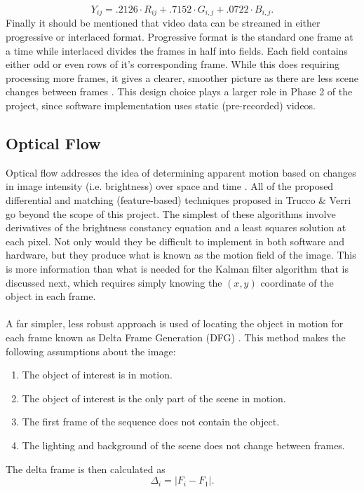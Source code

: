 \documentclass[12pt]{article} %
\begin{document}
\begin{equation}
Y_{ij} = .2126 \cdot R_{ij} + .7152 \cdot G_{i,j} + .0722 \cdot B_{i,j}.
\end{equation}
Finally it should be mentioned that video data can be streamed in either progressive or interlaced format. Progressive format is the standard one frame at a time while interlaced divides the frames in half into fields. Each field contains either odd or even rows of it's corresponding frame. While this does requiring processing more frames, it gives a clearer, smoother picture as there are less scene changes between frames \cite{1}. This design choice plays a larger role in Phase 2 of the project, since software implementation uses static (pre-recorded) videos.
\subsection{Optical Flow}
Optical flow addresses the idea of determining apparent motion based on changes in image intensity (i.e. brightness) over space and time \cite{4}. All of the proposed differential and matching (feature-based) techniques proposed in Trucco \& Verri \cite{4} go beyond the scope of this project. The simplest of these algorithms involve derivatives of the brightness constancy equation and a least squares solution at each pixel. Not only would they be difficult to implement in both software and hardware, but they produce what is known as the motion field of the image. This is more information than what is needed for the Kalman filter algorithm that is discussed next, which requires simply knowing the $(x,y)$ coordinate of the object in each frame. \\\\
A far simpler, less robust approach is used of locating the object in motion for each frame known as Delta Frame Generation (DFG) \cite{8}. This method makes the following assumptions about the image:
\begin{enumerate}
\item The object of interest is in motion.
\item The object of interest is the only part of the scene in motion.
\item The first frame of the sequence does not contain the object.
\item The lighting and background of the scene does not change between frames.
\end{enumerate}
The delta frame is then calculated as 
\begin{equation}
\Delta_i = | F_i - F_1 |.
\end{equation}
\end{document}
